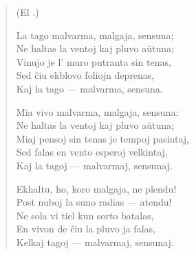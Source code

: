 \begin{verse}
\begin{center}
\footnotesize (El .)
\end{center}
                  La tago malvarma, malgaja, sensuna;\\
                  Ne haltas la ventoj kaj pluvo a\u utuna;\\
                  Vinujo je l' muro putranta sin tenas,\\
                  Sed \^ciu ekblovo foliojn deprenas,\\
                  Kaj la tago --- malvarma, sensuna.

                  Mia vivo malvarma, malgaja, sensuna:\\
                  Ne haltas la ventoj kaj pluvo a\u utuna;\\
                  Miaj pensoj sin tenas je tempoj pasintaj,\\
                  Sed falas en vento esperoj velkintaj,\\
                  Kaj la tagoj --- malvarmaj, sensunaj.

                  Ekhaltu, ho, koro malgaja, ne plendu!\\
                  Post nuboj la suno radias --- atendu!\\
                  Ne sola vi tiel kun sorto batalas,\\
                  En vivon de \^ciu la pluvo ja falas,\\
                  Kelkaj tagoj --- malvarmaj, sensunaj.

\end{verse}


\smallrule{}
